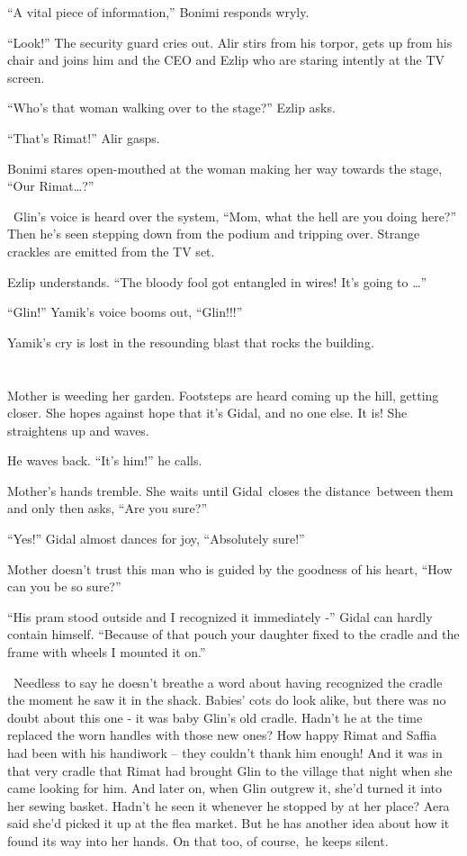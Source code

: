 \documentclass[twoside,11pt]{book}
\begin{document}
``A vital piece of information,'' Bonimi responds wryly.

``Look!'' The security guard cries out. Alir stirs from his torpor, gets up from his chair and
joins him and the CEO and Ezlip who are staring intently at the TV screen.

``Who's that woman walking over to the stage?'' Ezlip asks.

``That's Rimat!'' Alir gasps.

Bonimi stares open-mouthed at the woman making her way towards the stage, ``Our
Rimat{\dots}?''

~Glin's voice is heard over the system, ``Mom, what the hell are you doing here?'' Then
he{{}'}s seen stepping down from the podium and tripping over. Strange crackles
are emitted from the TV set.

Ezlip understands. ``The bloody fool got entangled in wires! It's going to {\dots}''

``Glin!'' Yamik's voice booms{ }out,
``Glin!!!''

Yamik's cry is lost in the resounding blast that rocks the building.


\bigskip

\chapter{}

Mother is weeding her garden. Footsteps are heard coming up the hill, getting closer. She hopes against hope that it's
Gidal, and{ }no one else. It is! She straightens up and waves.

He waves back. ``It's him!'' he calls.

Mother's hands tremble. She waits until Gidal~closes the distance~between them and only then
asks,{ }``Are you sure?''

``Yes!'' Gidal almost dances for joy, ``Absolutely sure!''

Mother doesn't trust this man who is guided by the goodness of his heart, ``How can you be so sure?''

``His pram stood outside and I recognized it immediately -'' Gidal can hardly contain himself.
``Because of that pouch your daughter fixed to the cradle and the frame with wheels I mounted it
on.''

~Needless to say he doesn't breathe a word about having recognized the cradle the moment he saw it in the shack. Babies'
cots do look alike, but there was no doubt about this one - it was baby Glin's old cradle. Hadn't he at the time
replaced the worn handles with those new ones? How happy Rimat and Saffia had been with his handiwork -- they couldn't
thank him enough!{ }And it was in that very cradle that Rimat had
brought{ }Glin to the village that night when she came looking for him. And
later on, when Glin outgrew it, she'd turned it into her sewing basket. Hadn't he seen it whenever he stopped
by{ }at{ }her place? Aera said she'd picked it up at the flea market. But he has another
idea about how it found its way into her hands. On that too, of course,~he keeps silent. ~~
\end{document}
